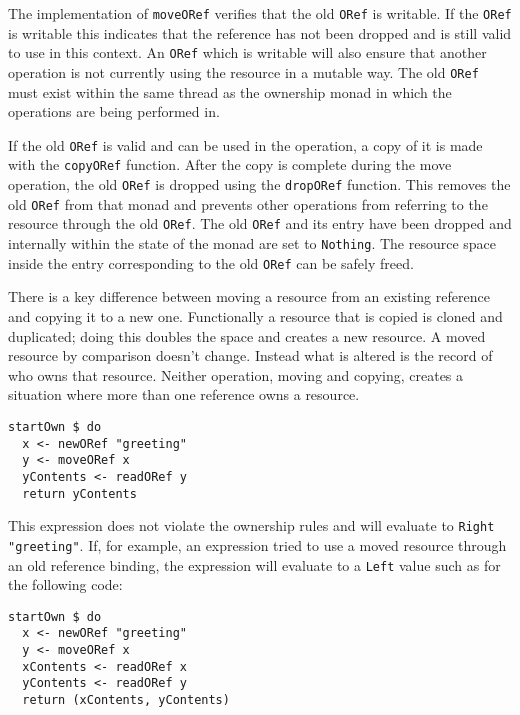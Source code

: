 \documentclass[onehalf,11pt]{beavtex}
\begin{document}
The implementation of \texttt{moveORef} verifies that the old \texttt{ORef}
is writable.
If the \texttt{ORef} is writable this indicates that the reference has not been
dropped and is still valid to use in this context.
An \texttt{ORef} which is writable will also ensure that another operation
is not currently using the resource in a mutable way.
The old \texttt{ORef} must exist within the same thread as the ownership monad
in which the operations are being performed in.

If the old \texttt{ORef} is valid and can be used in the operation, a copy of it is made
with the \texttt{copyORef} function.
After the copy is complete during the move operation, the old \texttt{ORef} is
dropped using the \texttt{dropORef} function.
This removes the old \texttt{ORef} from that monad and prevents other operations
from referring to the resource through the old \texttt{ORef}.
The old \texttt{ORef} and its entry have been dropped and internally within the
state of the monad are set to \texttt{Nothing}.
The resource space inside the entry corresponding to the old \texttt{ORef} can
be safely freed.

There is a key difference between moving a resource from an existing reference
and copying it to a new one.  Functionally a resource that is copied is cloned
and duplicated; doing this doubles the space and creates a new resource.
A moved resource by comparison doesn't change.  Instead what is altered is the
record of who owns that resource.  Neither operation, moving and copying,
creates a situation where more than one reference owns a resource.

\begin{lstlisting}
startOwn $ do
  x <- newORef "greeting"
  y <- moveORef x
  yContents <- readORef y
  return yContents
\end{lstlisting}

This expression does not violate the ownership rules and will evaluate
to \texttt{Right "greeting"}.
If, for example, an expression tried to use a moved resource through an
old reference binding, the expression will evaluate to a \texttt{Left} value
such as for the following code:

\begin{lstlisting}
startOwn $ do
  x <- newORef "greeting"
  y <- moveORef x
  xContents <- readORef x
  yContents <- readORef y
  return (xContents, yContents)
\end{lstlisting}
\end{document}
